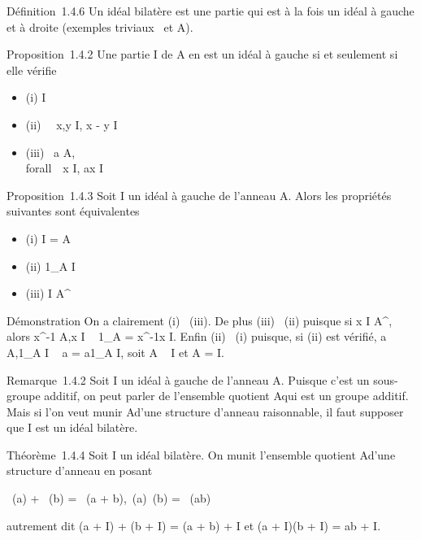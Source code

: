 Définition~1.4.6 Un idéal bilatère est une partie qui est à la fois un
idéal à gauche et à droite (exemples triviaux
\0\ et A).

Proposition~1.4.2 Une partie I de A en est un idéal à gauche si et
seulement si elle vérifie

\begin{itemize}
\itemsep1pt\parskip0pt
\item
  (i) I\neq~\varnothing~
\item
  (ii) \forall~~x,y \in I, x - y \in I
\item
  (iii) \forall~a \in A,\\forall~~x \in
  I, ax \in I
\end{itemize}

Proposition~1.4.3 Soit I un idéal à gauche de l'anneau A. Alors les
propriétés suivantes sont équivalentes

\begin{itemize}
\itemsep1pt\parskip0pt
\item
  (i) I = A
\item
  (ii) 1_A \in I
\item
  (iii) I \bigcap A^\times\neq~\varnothing~
\end{itemize}

Démonstration On a clairement (i) \rigtharrow~(iii). De plus (iii) \rigtharrow~(ii) puisque si
x \in I \bigcap A^\times, alors x^-1 \in A,x \in I \rigtharrow~ 1_A =
x^-1x \in I. Enfin (ii) \rigtharrow~(i) puisque, si (ii) est vérifié, a \in
A,1_A \in I \rigtharrow~ a = a1_A \in I, soit A \subset~ I et A = I.

Remarque~1.4.2 Soit I un idéal à gauche de l'anneau A. Puisque c'est un
sous-groupe additif, on peut parler de l'ensemble quotient A\diagupI qui est
un groupe additif. Mais si l'on veut munir A\diagupI d'une structure d'anneau
raisonnable, il faut supposer que I est un idéal bilatère.

Théorème~1.4.4 Soit I un idéal bilatère. On munit l'ensemble quotient
A\diagupI d'une structure d'anneau en posant

\pi~(a) + \pi~(b) = \pi~(a + b),\quad \pi~(a)\pi~(b) = \pi~(ab)

autrement dit (a + I) + (b + I) = (a + b) + I et (a + I)(b + I) = ab +
I.

